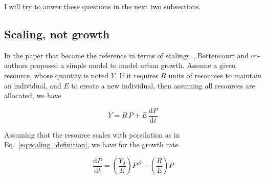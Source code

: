 I will try to anwer these questions in the next two subsections.

\subsection{Scaling, not growth}
\label{sub:scaling_not_growth}

In the paper that became the reference in terms of
scalings~\cite{Bettencourt:2007}, Bettencourt and co-authors proposed a simple
model to model urban growth. Assume a given resource, whose quantity is noted
$Y$. If it requires $R$ units of resources to maintain an individual, and $E$ to
create a new individual, then assuming all resources are allocated, we have

\begin{equation}
    Y = R\,P + E\,\frac{\mathrm{d}P}{\mathrm{d}t}
    \label{eq:growth_resource_allocation}
\end{equation}

Assuming that the resource scales with population as in
Eq.~\ref{eq:scaling_definition}, we have for the growth rate

\begin{equation}
    \frac{\mathrm{d}P}{\mathrm{d}t} = \left(\frac{Y_0}{E}\right) P^{\,\beta} -
\left(\frac{R}{E}\right)P 
    \end{equation}

